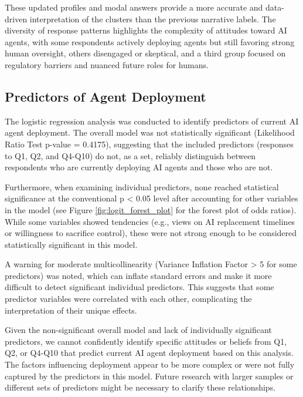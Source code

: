 \documentclass{article}
\begin{document}
These updated profiles and modal answers provide a more accurate and
data-driven interpretation of the clusters than the previous narrative
labels. The diversity of response patterns highlights the complexity of
attitudes toward AI agents, with some respondents actively deploying
agents but still favoring strong human oversight, others disengaged or
skeptical, and a third group focused on regulatory barriers and nuanced
future roles for humans.

\subsection{Predictors of Agent Deployment}\label{predictors-of-agent-deployment}

The logistic regression analysis was conducted to identify predictors of current AI agent deployment. The overall model was not statistically significant (Likelihood Ratio Test p-value = 0.4175), suggesting that the included predictors (responses to Q1, Q2, and Q4-Q10) do not, as a set, reliably distinguish between respondents who are currently deploying AI agents and those who are not.

Furthermore, when examining individual predictors, none reached statistical significance at the conventional p < 0.05 level after accounting for other variables in the model (see Figure \ref{fig:logit_forest_plot} for the forest plot of odds ratios). While some variables showed tendencies (e.g., views on AI replacement timelines or willingness to sacrifice control), these were not strong enough to be considered statistically significant in this model.

A warning for moderate multicollinearity (Variance Inflation Factor > 5 for some predictors) was noted, which can inflate standard errors and make it more difficult to detect significant individual predictors. This suggests that some predictor variables were correlated with each other, complicating the interpretation of their unique effects.

Given the non-significant overall model and lack of individually significant predictors, we cannot confidently identify specific attitudes or beliefs from Q1, Q2, or Q4-Q10 that predict current AI agent deployment based on this analysis. The factors influencing deployment appear to be more complex or were not fully captured by the predictors in this model. Future research with larger samples or different sets of predictors might be necessary to clarify these relationships.
\end{document}

